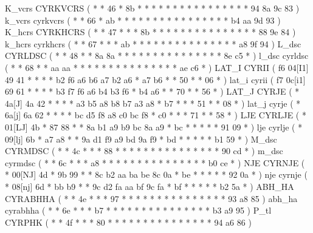 \makeCOD K_vcrs       CYRKVCRS          ( *  *       46 *   8b *  *  *     *  *  *  *  *     *  *  *  *     *  *  *     *   94 8a   9c 83  )
\makecod k_vcrs       cyrkvcrs          ( *  *       66 *   ab *  *  *     *  *  *  *  *     *  *  *  *     *  *  *     *   b4 aa   9d 93  )
\makeCOD K_hcrs       CYRKHCRS          ( *  *       47 *   *  *  8b *     *  *  *  *  *     *  *  *  *     *  *  *     *   *  88   9e 84  )
\makecod k_hcrs       cyrkhcrs          ( *  *       67 *   *  *  ab *     *  *  *  *  *     *  *  *  *     *  *  *     *   *  a8   9f 94  )
\makeCOD L_dsc        CYRLDSC           ( *  *       48 *   *  8a 8a *     *  *  *  *  *     *  *  *  *     *  *  *     *   *  8e   c5 *   )
\makecod l_dsc        cyrldsc           ( *  *       68 *   *  aa aa *     *  *  *  *  *     *  *  *  *     *  *  *     *   *  ae   c6 *   )
\makeCOD LAT_I        CYRII             ( f6 04[I1]  49 41  *  *  *  *     b2 f6 a6 b6 a7    b2 a6 *  a7    b6 *  *     50  *  *    06 *   )
\makecod lat_i        cyrii             ( f7 0c[i1]  69 61  *  *  *  *     b3 f7 f6 a6 b4    b3 f6 *  b4    a6 *  *     70  *  *    56 *   )
\makeCOD LAT_J        CYRJE             ( *  4a[J]   4a 42  *  *  *  *     a3 b5 a8 b8 b7    a3 a8 *  b7    *  *  *     51  *  *    08 *   )
\makecod lat_j        cyrje             ( *  6a[j]   6a 62  *  *  *  *     bc d5 f8 a8 c0    bc f8 *  c0    *  *  *     71  *  *    58 *   )
\makeCOD LJE          CYRLJE            ( *  01[LJ]  4b *   87 88 *  *     8a b1 a9 b9 bc    8a a9 *  bc    *  *  *     *   *  91   09 *   )%
\makecod lje          cyrlje            ( *  09[lj]  6b *   a7 a8 *  *     9a d1 f9 a9 bd    9a f9 *  bd    *  *  *     *   *  b1   59 *   )%
\makeCOD M_dsc        CYRMDSC           ( *  *       4c *   *  *  88 *     *  *  *  *  *     *  *  *  *     *  *  *     *   *  90   cd *   )
\makecod m_dsc        cyrmdsc           ( *  *       6c *   *  *  a8 *     *  *  *  *  *     *  *  *  *     *  *  *     *   *  b0   ce *   )
\makeCOD NJE          CYRNJE            ( *  00[NJ]  4d *   9b 99 *  *     8c b2 aa ba be    8c 0a *  be    *  *  *     *   *  92   0a *   )%
\makecod nje          cyrnje            ( *  08[nj]  6d *   bb b9 *  *     9c d2 fa aa bf    9c fa *  bf    *  *  *     *   *  b2   5a *   )%
\makeCOD ABH_HA       CYRABHHA          ( *  *       4e *   *  *  97 *     *  *  *  *  *     *  *  *  *     *  *  *     *   *  93   a8 85  )
\makecod abh_ha       cyrabhha          ( *  *       6e *   *  *  b7 *     *  *  *  *  *     *  *  *  *     *  *  *     *   *  b3   a9 95  )
\makeCOD P_tl         CYRPHK            ( *  *       4f *   *  *  80 *     *  *  *  *  *     *  *  *  *     *  *  *     *   *  94   a6 86  )
